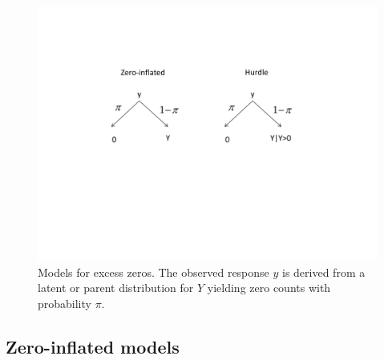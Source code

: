 \documentclass[11pt]{book}\usepackage[]{graphicx}\usepackage[]{color}
\begin{document}
\begin{figure}[htb]
  \centering
  \includegraphics[width=.6\textwidth]{ch09/fig/ExcessZeros}
  \caption{Models for excess zeros. The observed response $y$ is derived from a latent or parent
  distribution for $Y$ yielding zero counts with probability $\pi$.}
  \label{fig:ExcessZeros}
\end{figure}

\subsection{Zero-inflated models}\label{sec:glm-zip}
\end{document}
